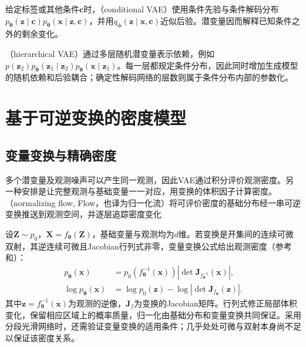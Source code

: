 给定标签或其他条件$\bm{c}$时，（conditional VAE）使用条件先验与条件解码分布$p_{\bm{\theta}}(\bm{z}\mid\bm{c})p_{\bm{\theta}}(\bm{x}\mid\bm{z},\bm{c})$，并用$q_{\bm{\phi}}(\bm{z}\mid\bm{x},\bm{c})$近似后验。潜变量因而解释已知条件之外的剩余变化。

（hierarchical VAE）通过多层随机潜变量表示依赖，例如$p(\bm{z}_2)p_{\bm{\theta}}(\bm{z}_1\mid\bm{z}_2)p_{\bm{\theta}}(\bm{x}\mid\bm{z}_1)$。每一层都规定条件分布，因此同时增加生成模型的随机依赖和后验耦合；确定性解码网络的层数则属于条件分布内部的参数化。

\section{基于可逆变换的密度模型}
\label{sec:pgm-generative-flows}

\subsection{变量变换与精确密度}
\label{sec:pgm-generative-change-of-variables}

多个潜变量及观测噪声可以产生同一观测，因此VAE通过积分评价观测密度。另一种安排是让完整观测与基础变量一一对应，用变换的体积因子计算密度。（normalizing flow, Flow，也译为归一化流）将可评价密度的基础分布经一串可逆变换推送到观测空间，并逐层追踪密度变化

设$\bm Z\sim p_0$，$\bm X=f_{\bm\theta}(\bm Z)$，基础变量与观测均为$d$维。若变换是开集间的连续可微双射，其逆连续可微且Jacobian行列式非零，变量变换公式给出观测密度（参考和）：
\begin{equation}
  \label{eq:pgm-generative-flow-density}
  \begin{aligned}
    p_{\bm{\theta}}(\bm{x})
      &=p_0(f_{\bm{\theta}}^{-1}(\bm{x}))
         \left|\det\bm{J}_{f_{\bm{\theta}}^{-1}}(\bm{x})\right|,\\
    \log p_{\bm{\theta}}(\bm{x})
      &=\log p_0(\bm{z})-
         \log\left|\det\bm{J}_{f_{\bm{\theta}}}(\bm{z})\right|.
  \end{aligned}
\end{equation}
其中$\bm z=f_{\bm\theta}^{-1}(\bm x)$为观测的逆像，$\bm J_f$为变换的Jacobian矩阵。行列式修正局部体积变化，保留相应区域上的概率质量，归一化由基础分布和变量变换共同保证。采用分段光滑网络时，还需验证变量变换的适用条件；几乎处处可微与双射本身尚不足以保证该密度关系。

